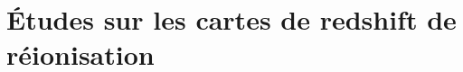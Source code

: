 \documentclass[ twoside,openright,titlepage,numbers=noenddot,headinclude,%
                footinclude=true,cleardoublepage=empty,abstractoff, %
                BCOR=5mm,paper=a4,fontsize=11pt,%
                frenchb,english,%
                ]{scrreprt}
\begin{document}
\part{Études sur les cartes de redshift de réionisation}


%
%
%
%
%
%
%
%
%
\appendix
\cleardoublepage
% 
\end{document}
